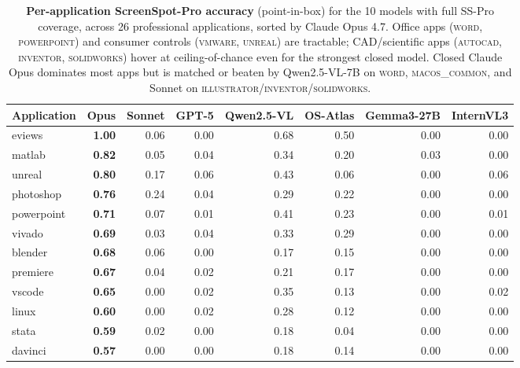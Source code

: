 \begin{table}[t]
\centering
\scriptsize
\begin{threeparttable}
\caption{\textbf{Per-application ScreenSpot-Pro accuracy} (point-in-box) for
the 10 models with full SS-Pro coverage, across 26 professional
applications, sorted by Claude Opus 4.7. Office apps (\textsc{word},
\textsc{powerpoint}) and consumer controls (\textsc{vmware},
\textsc{unreal}) are tractable; CAD/scientific apps (\textsc{autocad},
\textsc{inventor}, \textsc{solidworks}) hover at ceiling-of-chance even
for the strongest closed model. Closed Claude Opus dominates most apps
but is matched or beaten by Qwen2.5-VL-7B on
\textsc{word}, \textsc{macos\_common}, and Sonnet on
\textsc{illustrator}/\textsc{inventor}/\textsc{solidworks}.}
\label{tab:per-app}
\begin{tabular}{@{}lrrrrrrr@{}}
\toprule
\textbf{Application} & \textbf{Opus} & \textbf{Sonnet} & \textbf{GPT-5} & \textbf{Qwen2.5-VL} & \textbf{OS-Atlas} & \textbf{Gemma3-27B} & \textbf{InternVL3} \\
\midrule
eviews          & \textbf{1.00} & 0.06 & 0.00 & 0.68 & 0.50 & 0.00 & 0.00 \\
matlab          & \textbf{0.82} & 0.05 & 0.04 & 0.34 & 0.20 & 0.03 & 0.00 \\
unreal          & \textbf{0.80} & 0.17 & 0.06 & 0.43 & 0.06 & 0.00 & 0.06 \\
photoshop       & \textbf{0.76} & 0.24 & 0.04 & 0.29 & 0.22 & 0.00 & 0.00 \\
powerpoint      & \textbf{0.71} & 0.07 & 0.01 & 0.41 & 0.23 & 0.00 & 0.01 \\
vivado          & \textbf{0.69} & 0.03 & 0.04 & 0.33 & 0.29 & 0.00 & 0.00 \\
blender         & \textbf{0.68} & 0.06 & 0.00 & 0.17 & 0.15 & 0.00 & 0.00 \\
premiere        & \textbf{0.67} & 0.04 & 0.02 & 0.21 & 0.17 & 0.00 & 0.00 \\
vscode          & \textbf{0.65} & 0.00 & 0.02 & 0.35 & 0.13 & 0.00 & 0.02 \\
linux           & \textbf{0.60} & 0.00 & 0.02 & 0.28 & 0.12 & 0.00 & 0.00 \\
stata           & \textbf{0.59} & 0.02 & 0.00 & 0.18 & 0.04 & 0.00 & 0.00 \\
davinci         & \textbf{0.57} & 0.00 & 0.00 & 0.18 & 0.14 & 0.00 & 0.00 \\

\end{tabular}
\end{threeparttable}
\end{table}
